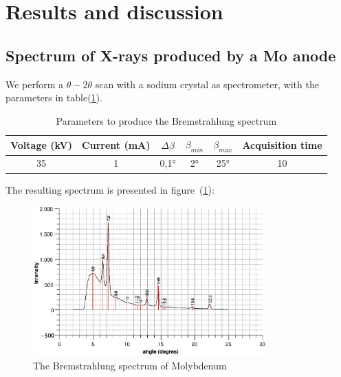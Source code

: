 \documentclass{scrartcl}
\begin{document}
\section{Results and discussion}

\subsection{Spectrum of X-rays produced by a Mo anode}

We perform a $\theta-2\theta$ scan with a sodium crystal as spectrometer, with the parameters in table(\ref{tab:parameterBremsstrahlungsSpectrum}).

\begin{table}[!ht]
    \centering
    \begin{tabular}{c|c|c|c|c|c}
    Voltage (kV) & Current (mA) & $\Delta \beta$ & $\beta_{min}$   &  $\beta_{max}$   &  Acquisition time  \\ \hline
    35  & 1 & 0,1° & 2° & 25° & 10 \\
    \end{tabular}
    \caption{Parameters to produce the Bremstrahlung spectrum}
    \label{tab:parameterBremsstrahlungsSpectrum}
\end{table}

\noindent The resulting spectrum is presented in figure~(\ref{fig:bremsstrahlungSpectrum}):

\begin{figure}[!ht]
    \centering
    \includegraphics[width=0.8\textwidth]{firstmeasurement.eps}
    \caption{The Bremstrahlung spectrum of Molybdenum}
    \label{fig:bremsstrahlungSpectrum}
\end{figure}
\end{document}
